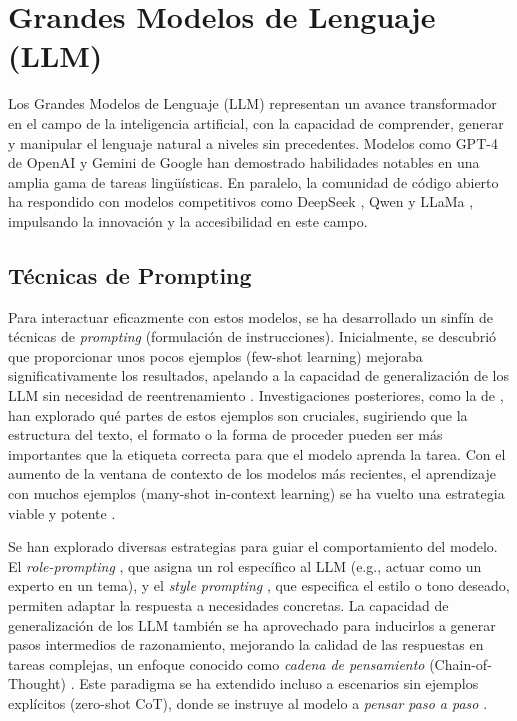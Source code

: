 \section{Grandes Modelos de Lenguaje (LLM)}
\label{sec:llm}
Los Grandes Modelos de Lenguaje (LLM) representan un avance transformador en el campo de la inteligencia artificial, con la capacidad de comprender, generar y manipular el lenguaje natural a niveles sin precedentes. Modelos como GPT-4 de OpenAI \parencite{openaiGPT4TechnicalReport2024} y Gemini de Google \parencite{teamGeminiFamilyHighly2024} han demostrado habilidades notables en una amplia gama de tareas lingüísticas. En paralelo, la comunidad de código abierto ha respondido con modelos competitivos como DeepSeek \parencite{deepseek-aiDeepSeekV3TechnicalReport2024}, Qwen \parencite{baiQwenTechnicalReport2023} y LLaMa \parencite{grattafioriLlama3Herd2024}, impulsando la innovación y la accesibilidad en este campo.

\subsection{Técnicas de Prompting}
\label{subsec:prompting_techniques}
Para interactuar eficazmente con estos modelos, se ha desarrollado un sinfín de técnicas de \textit{prompting} (formulación de instrucciones). Inicialmente, se descubrió que proporcionar unos pocos ejemplos (few-shot learning) mejoraba significativamente los resultados, apelando a la capacidad de generalización de los LLM sin necesidad de reentrenamiento \parencite{brownLanguageModelsAre2020}. Investigaciones posteriores, como la de \cite{minRethinkingRoleDemonstrations2022}, han explorado qué partes de estos ejemplos son cruciales, sugiriendo que la estructura del texto, el formato o la forma de proceder pueden ser más importantes que la etiqueta correcta para que el modelo aprenda la tarea. Con el aumento de la ventana de contexto de los modelos más recientes, el aprendizaje con muchos ejemplos (many-shot in-context learning) se ha vuelto una estrategia viable y potente \parencite{agarwalManyShotInContextLearning2024}.

Se han explorado diversas estrategias para guiar el comportamiento del modelo. El \textit{role-prompting} \parencite{kongBetterZeroShotReasoning2024}, que asigna un rol específico al LLM (e.g., actuar como un experto en un tema), y el \textit{style prompting} \parencite{luBoundingCapabilitiesLarge2023}, que especifica el estilo o tono deseado, permiten adaptar la respuesta a necesidades concretas. La capacidad de generalización de los LLM también se ha aprovechado para inducirlos a generar pasos intermedios de razonamiento, mejorando la calidad de las respuestas en tareas complejas, un enfoque conocido como \textit{cadena de pensamiento} (Chain-of-Thought) \parencite{nyeShowYourWork2021, weiChainofThoughtPromptingElicits2023}. Este paradigma se ha extendido incluso a escenarios sin ejemplos explícitos (zero-shot CoT), donde se instruye al modelo a \textit{pensar paso a paso} \parencite{kojimaLargeLanguageModels2023, wangPlanandSolvePromptingImproving2023}.

